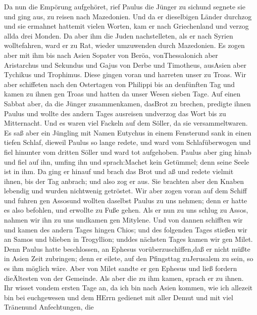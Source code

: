  Da nun die Empörung aufgehöret, rief Paulus die Jünger zu
sichund segnete sie und ging aus, zu reisen nach Mazedonien.
 Und da er dieselbigen Länder durchzog und sie ermahnet
hattemit vielen Worten, kam er nach Griechenland und verzog allda drei
Monden.  Da aber ihm die Juden nachstelleten, als er nach
Syrien wolltefahren, ward er zu Rat, wieder umzuwenden durch Mazedonien.
 Es zogen aber mit ihm bis nach Asien Sopater von Beröa,
vonThessalonich aber Aristarchus und Sekundus und Gajus von Derbe und
Timotheus, ausAsien aber Tychikus und Trophimus.  Diese
gingen voran und harreten unser zu Troas.  Wir aber
schiffeten nach den Ostertagen von Philippi bis an denfünften Tag und
kamen zu ihnen gen Troas und hatten da unser Wesen sieben Tage.
 Auf einen Sabbat aber, da die Jünger zusammenkamen, dasBrot
zu brechen, predigte ihnen Paulus und wollte des andern Tages ausreisen
undverzog das Wort bis zu Mitternacht.  Und es waren viel
Fackeln auf dem Söller, da sie versammeltwaren.  Es saß aber
ein Jüngling mit Namen Eutychus in einem Fensterund sank in einen tiefen
Schlaf, dieweil Paulus so lange redete, und ward vom Schlafüberwogen und
fiel hinunter vom dritten Söller und ward tot aufgehoben. 
Paulus aber ging hinab und fiel auf ihn, umfing ihn und sprach:Machet
kein Getümmel; denn seine Seele ist in ihm.  Da ging er
hinauf und brach das Brot und aß und redete vielmit ihnen, bis der Tag
anbrach; und also zog er aus.  Sie brachten aber den Knaben
lebendig und wurden nichtwenig getröstet.  Wir aber zogen
voran auf dem Schiff und fuhren gen Assosund wollten daselbst Paulus zu
uns nehmen; denn er hatte es also befohlen, und erwollte zu Fuße gehen.
 Als er nun zu uns schlug zu Assos, nahmen wir ihn zu uns
undkamen gen Mitylene.  Und von dannen schifften wir und
kamen des andern Tages hingen Chios; und des folgenden Tages stießen wir
an Samos und blieben in Trogyllion; unddes nächsten Tages kamen wir gen
Milet.  Denn Paulus hatte beschlossen, an Ephesus
vorüberzuschiffen,daß er nicht müßte in Asien Zeit zubringen; denn er
eilete, auf den Pfingsttag zuJerusalem zu sein, so es ihm möglich wäre.
 Aber von Milet sandte er gen Ephesus und ließ fordern
dieÄltesten von der Gemeinde.  Als aber die zu ihm kamen,
sprach er zu ihnen. Ihr wisset vondem ersten Tage an, da ich bin nach
Asien kommen, wie ich allezeit bin bei euchgewesen  und dem
HErrn gedienet mit aller Demut und mit viel Tränenund Anfechtungen, die
